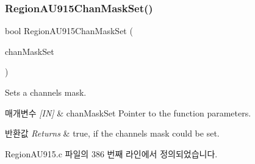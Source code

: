 \subsubsection{\texorpdfstring{Region\+A\+U915\+Chan\+Mask\+Set()}{RegionAU915ChanMaskSet()}}
{\footnotesize\ttfamily bool Region\+A\+U915\+Chan\+Mask\+Set (\begin{DoxyParamCaption}\item[{\mbox{\hyperlink{group___r_e_g_i_o_n_ga6d24f7da136006410827dfb29f6b9b9e}{Chan\+Mask\+Set\+Params\+\_\+t}} $\ast$}]{chan\+Mask\+Set }\end{DoxyParamCaption})}



Sets a channels mask. 


\begin{DoxyParams}{매개변수}
{\em \mbox{[}\+I\+N\mbox{]}} & chan\+Mask\+Set Pointer to the function parameters.\\
\hline
\end{DoxyParams}

\begin{DoxyRetVals}{반환값}
{\em Returns} & true, if the channels mask could be set. \\
\hline
\end{DoxyRetVals}


Region\+A\+U915.\+c 파일의 386 번째 라인에서 정의되었습니다.


